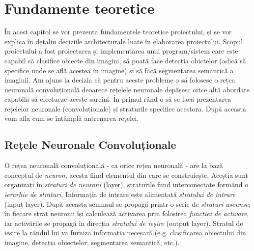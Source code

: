\chapter{Fundamente teoretice}
În acest capitol se vor prezenta fundamentele teoretice proiectului, și se vor explica în detaliu deciziile architecturale luate în elaborarea proiectului.\newline
Scopul proiectului a fost proiectarea și implementarea unui program/sistem care este capabil să clasifice obiecte din imagini, să poată face detecția obictelor (adică să specifice unde se află acestea în imagine) și să facă segmentarea semantică a imaginii. Am ajuns la decizia că pentru aceste probleme o să folosesc o rețea neuronală convoluțională deoarece rețelele neuronale depășesc orice altă abordare capabilă să efectueze aceste sarcini.\newline
În primul rând o să se facă prezentarea rețelelor neuronale (convoluționale) și straturile specifice acestora. După aceasta vom afla cum se întâmplă antrenarea rețelei.

\section{Rețele Neuronale Convoluționale}
O rețea neuronală convoluțională - ca orice rețea neuronală - are la bază conceptul de \textit{neuron}, acesta fiind elementul din care se construiește. Aceștia sunt organizați în \textit{straturi de neuroni} (layer), straturile fiind interconectate formând o \textit{ierarhie de straturi}.\newline
Informația de intrare este alimentată \textit{stratului de intrare} (input layer). După aceasta semnaul se propagă printr-o serie de \textit{straturi ascunse}; în fiecare strat neuronii își calculează activarea prin folosirea \textit{funcției de activare}, iar activările se propagă în direcția \textit{stratului de ieșire} (output layer). Stratul de ieșire la rândul lui va furniza informația necesară (e.g. clasificarea obiectului din imagine, detecția obiectelor, segmentarea semantică, etc.).


